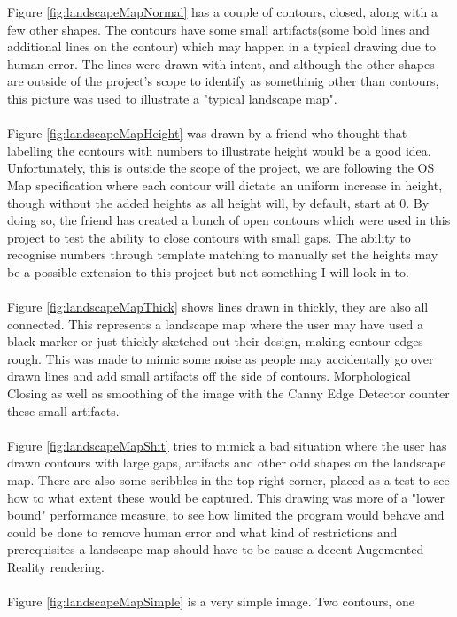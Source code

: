 \documentclass[11pt]{article}
\begin{document}
Figure \ref{fig:landscapeMapNormal} has a couple of contours, closed, along with
a few other shapes. The contours have some small artifacts(some bold lines and
additional lines on the contour) which may happen in a typical drawing due to 
human error. The lines were drawn with intent, and although the other shapes are 
outside of the project's scope to identify as somethinig other than contours,
this picture was used to illustrate a "typical landscape map". \\
\\
Figure \ref{fig:landscapeMapHeight} was drawn by a friend who thought that 
labelling the contours with numbers to illustrate height would be a good idea.
Unfortunately, this is outside the scope of the project, we are following
the OS Map specification where each contour will dictate an uniform increase in
height, though without the added heights as all height will, by default, start
at 0. By doing so, the friend has created a bunch of open contours which were
used in this project to test the ability to close contours with small gaps. 
The ability to recognise numbers through template matching to manually set the 
heights may be a possible extension to this project but not something I will look
in to. \\
\\
Figure \ref{fig:landscapeMapThick} shows lines drawn in thickly, they are also
all connected. This represents a landscape map where the user may have used
a black marker or just thickly sketched out their design, making contour edges 
rough. This was made to mimic some noise as people may accidentally go over 
drawn lines and add small artifacts off the side of contours. 
Morphological Closing as well
as smoothing of the image with the Canny Edge Detector counter these small
artifacts.\\
\\
Figure \ref{fig:landscapeMapShit} tries to mimick a bad situation where
the user has drawn contours with large gaps, artifacts and other odd shapes
on the landscape map. There are also some scribbles in the top right corner, 
placed as a test to see how to what extent these would be captured. 
This drawing was more of a "lower bound" performance measure, to see
how limited the program would behave and could be done to remove human error
and what kind of restrictions and prerequisites a landscape map should have
to be cause a decent Augemented Reality rendering.\\
\\
Figure \ref{fig:landscapeMapSimple} is a very simple image. Two contours, one 
\end{document}
